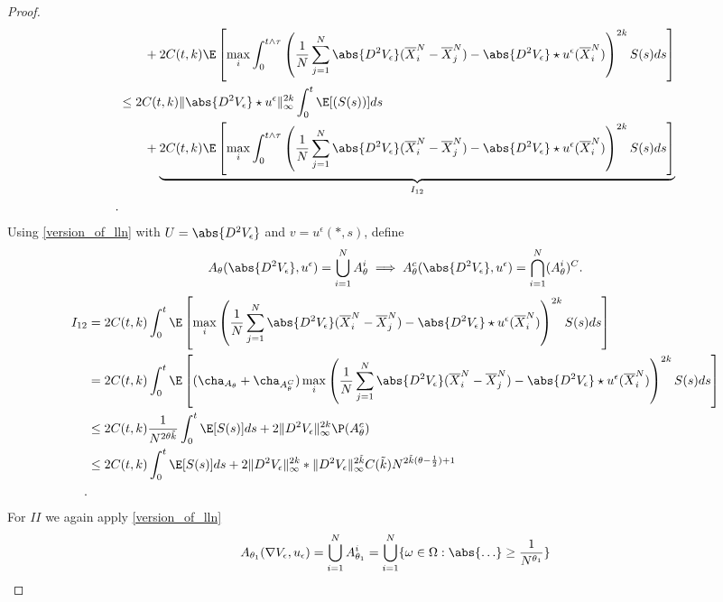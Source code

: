 \begin{proof}
\begin{align*}
        &\qquad + 2 C(t,k) \E\left[\max_{i} \int_0^{t \land \tau } \left( \frac{1}{N} \sum_{j=1}^{N} \abs{D^2 V_\epsilon}(\overline{X}_i^{N} - \overline{X}_{j}^{N}   ) - \abs{D^{2}V_\epsilon } \star  u^{\epsilon}(\overline{X}_i^{N}  )  \right)^{2k} S(s) ds \right] \\
        &\le  2 C(t,k) \|\abs{D^2 V_\epsilon} \star  u ^{\epsilon} \|_{\infty}^{2k}  \int_0^{t} \E[(S(s))]  ds \\
        &\qquad + \underbrace{2 C(t,k) \E\left[\max_{i} \int_0^{t \land \tau } \left( \frac{1}{N} \sum_{j=1}^{N} \abs{D^2 V_\epsilon}(\overline{X}_i^{N} - \overline{X}_{j}^{N}   ) - \abs{D^{2}V_\epsilon } \star  u^{\epsilon}(\overline{X}_i^{N}  )  \right)^{2k} S(s) ds \right]}_{I_{12}} \\
.\end{align*}
Using \autoref{version_of_lln} with $U = \abs{D^2V_{\epsilon}}$ and $v = u^{\epsilon}(*,s) $, define 
\begin{align*}
  A_{\theta }(\abs{D^2 V_{\epsilon}},u^{\epsilon} )= \bigcup_{i=1}^{N}  A^{i}_{\theta } \implies A_{\theta }^{c} (\abs{D^2 V_{\epsilon}},u^{\epsilon} ) = \bigcap_{i=1}^{N} (A_{\theta }^{i} )^{C} 
.\end{align*}
\begin{align*}
  I_{12} &=  2 C(t,k) \int_0^{t}  \E\left[\max_{i} \left( \frac{1}{N} \sum_{j=1}^{N} \abs{D^2 V_\epsilon}(\overline{X}_i^{N} - \overline{X}_{j}^{N}   ) - \abs{D^{2}V_\epsilon } \star  u^{\epsilon}(\overline{X}_i^{N}  )  \right)^{2k} S(s) ds \right]\\
        &=  2 C(t,k) \int_0^{t}  \E\left[(\cha_{A_\theta} + \cha_{A^{C}_{\theta} })\max_{i} \left( \frac{1}{N} \sum_{j=1}^{N} \abs{D^2 V_\epsilon}(\overline{X}_i^{N} - \overline{X}_{j}^{N}   ) - \abs{D^{2}V_\epsilon } \star  u^{\epsilon}(\overline{X}_i^{N}  )  \right)^{2k} S(s) ds \right]\\
        &\le  2 C(t,k) \frac{1}{N^{2\theta \tilde{k}  } }\int_0^{t}   \E[S(s)] ds  + 2 \|D^2 V_\epsilon\|_{\infty}^{2 k }  \P(A_{\theta }^{c} )\\
        &\le 2 C(t,k) \int_0^{t}   \E[S(s)] ds  + 2 \|D^2 V_\epsilon\|_{\infty}^{2 k }*\|D^2 V_{\epsilon}\|_{\infty}^{2 \tilde{k} } C(\tilde{k} ) N^{2 \tilde{k}(\theta -\frac{1}{2})+1 }  \\
.\end{align*}
For $II$ we again apply \autoref{version_of_lln} 
\begin{align*}
  A_{\theta_{1} }(\nabla V_{\epsilon},u_\epsilon) =\bigcup_{i=1}^{N} A_{\theta_1}^{i}  = \bigcup_{i=1}^{N}  \{\omega  \in  \Omega  : \abs{\ldots } \ge  \frac{1}{N^{\theta_1} }\}  

\end{align*}
\end{proof}
